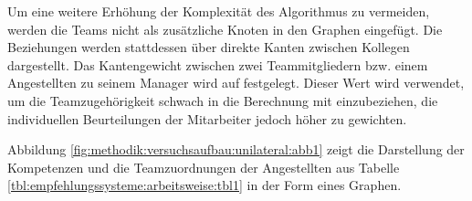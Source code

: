 Um eine weitere Erhöhung der Komplexität des Algorithmus zu vermeiden, werden die Teams nicht als zusätzliche Knoten in den Graphen eingefügt. Die Beziehungen werden stattdessen über direkte Kanten zwischen Kollegen dargestellt. Das Kantengewicht zwischen zwei Teammitgliedern bzw. einem Angestellten zu seinem Manager wird auf \teamgewichtString festgelegt. Dieser Wert wird verwendet, um die Teamzugehörigkeit schwach in die Berechnung mit einzubeziehen, die individuellen Beurteilungen der Mitarbeiter jedoch höher zu gewichten.%

Abbildung \ref{fig:methodik:versuchsaufbau:unilateral:abb1} zeigt die Darstellung der Kompetenzen und die Teamzuordnungen der Angestellten aus Tabelle \ref{tbl:empfehlungssysteme:arbeitsweise:tbl1} in der Form eines Graphen.%

